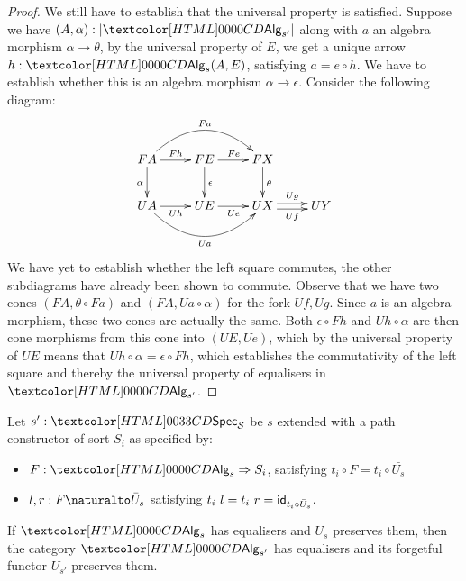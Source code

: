 \begin{proof}
  We still have to establish that the universal property is
  satisfied. Suppose we have $(A, \alpha) : | \Alg_{s'} |$ along with
  $a$ an algebra morphism $\alpha \to \theta$, by the universal
  property of $E$, we get a unique arrow $h : \Alg_s(A,E)$, satisfying
  $a = e \circ h$. We have to establish whether this is an algebra
  morphism $\alpha \to \epsilon$. Consider the following diagram:
  $$
  \xymatrix{
    FA
    \ar[r]^{Fh}
    \ar[d]_{\alpha}
    \ar@/^2pc/[rr]^{Fa}
    &FE 
    \ar[r]^{Fe}
    \ar[d]^{\epsilon}
    &FX
    \ar[d]^{\theta}
    \\
    UA
    \ar[r]_{Uh}
    \ar@/_2pc/[rr]_{Ua}
    &UE
    \ar[r]_{Ue}
    &UX
    \ar@<-.5ex>[r]_-{Uf} \ar@<.5ex>[r]^-{Ug}
    &UY
  }
  $$
  We have yet to establish whether the left square commutes, the other
  subdiagrams have already been shown to commute. Observe that we have
  two cones $(FA, \theta \circ Fa)$ and $(FA, Ua \circ \alpha)$ for
  the fork $Uf, Ug$. Since $a$ is an algebra morphism, these two cones
  are actually the same. Both $\epsilon \circ Fh$ and
  $Uh \circ \alpha$ are then cone morphisms from this cone into
  $(UE,Ue)$, which by the universal property of $UE$ means that
  $Uh \circ \alpha = \epsilon \circ Fh$, which establishes the
  commutativity of the left square and thereby the universal property
  of equalisers in $\Alg_{s'}$.
\end{proof}

\begin{lemma}
  Let $s' : \specty_\Ss$ be $s$ extended with a path constructor of sort
  $S_i$ as specified by:
  \begin{itemize}
  \item $F : \Func{\Alg_s}{S_i}$, satisfying $t_i \circ F = t_i \circ \bar{U_s}$
  \item $l, r : \Nat{F}{\bar{U}_s}$ satisfying
    $t_i\ l = t_i\ r = \id_{t_i \circ \bar{U}_s}$.
  \end{itemize}

  If $\Alg_s$ has equalisers and $U_s$ preserves them, then the category
  $\Alg_{s'}$ has equalisers and its forgetful functor $U_{s'}$
  preserves them.
\end{lemma}

